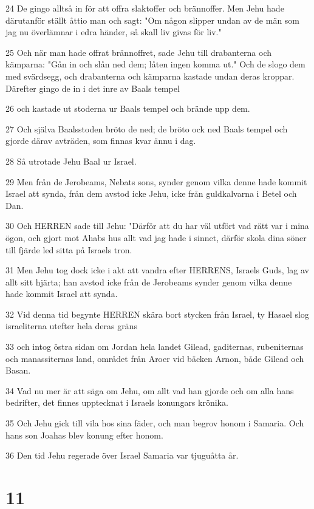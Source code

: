 \par 24 De gingo alltså in för att offra slaktoffer och brännoffer. Men Jehu hade därutanför ställt åttio man och sagt: "Om någon slipper undan av de män som jag nu överlämnar i edra händer, så skall liv givas för liv."
\par 25 Och när man hade offrat brännoffret, sade Jehu till drabanterna och kämparna: "Gån in och slån ned dem; låten ingen komma ut." Och de slogo dem med svärdsegg, och drabanterna och kämparna kastade undan deras kroppar. Därefter gingo de in i det inre av Baals tempel
\par 26 och kastade ut stoderna ur Baals tempel och brände upp dem.
\par 27 Och själva Baalsstoden bröto de ned; de bröto ock ned Baals tempel och gjorde därav avträden, som finnas kvar ännu i dag.
\par 28 Så utrotade Jehu Baal ur Israel.
\par 29 Men från de Jerobeams, Nebats sons, synder genom vilka denne hade kommit Israel att synda, från dem avstod icke Jehu, icke från guldkalvarna i Betel och Dan.
\par 30 Och HERREN sade till Jehu: "Därför att du har väl utfört vad rätt var i mina ögon, och gjort mot Ahabs hus allt vad jag hade i sinnet, därför skola dina söner till fjärde led sitta på Israels tron.
\par 31 Men Jehu tog dock icke i akt att vandra efter HERRENS, Israels Guds, lag av allt sitt hjärta; han avstod icke från de Jerobeams synder genom vilka denne hade kommit Israel att synda.
\par 32 Vid denna tid begynte HERREN skära bort stycken från Israel, ty Hasael slog israeliterna utefter hela deras gräns
\par 33 och intog östra sidan om Jordan hela landet Gilead, gaditernas, rubeniternas och manassiternas land, området från Aroer vid bäcken Arnon, både Gilead och Basan.
\par 34 Vad nu mer är att säga om Jehu, om allt vad han gjorde och om alla hans bedrifter, det finnes upptecknat i Israels konungars krönika.
\par 35 Och Jehu gick till vila hos sina fäder, och man begrov honom i Samaria. Och hans son Joahas blev konung efter honom.
\par 36 Den tid Jehu regerade över Israel Samaria var tjuguåtta år.

\chapter{11}

